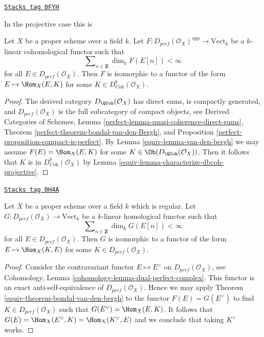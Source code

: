 \begin{theorem}
\label{equiv-theorem-bondal-van-den-bergh}
\href{https://stacks.math.columbia.edu/tag/0FYH}{\texttt{Stacks tag 0FYH}}

\begin{reference}
In the projective case this is \cite[Theorem A.1]{BvdB}
\end{reference}
Let $X$ be a proper scheme over a field $k$.
Let $F : D_{perf}(\mathcal{O}_X)^{opp} \to \text{Vect}_k$
be a $k$-linear cohomological functor such that
$$
\sum\nolimits_{n \in \mathbf{Z}} \dim_k F(E[n]) < \infty
$$
for all $E \in D_{perf}(\mathcal{O}_X)$. Then $F$ is isomorphic to a functor
of the form $E \mapsto \Hom_X(E, K)$ for some
$K \in D^b_{\textit{Coh}}(\mathcal{O}_X)$.
\end{theorem}

\begin{proof}

The derived category $D_\QCoh(\mathcal{O}_X)$ has direct sums,
is compactly generated, and $D_{perf}(\mathcal{O}_X)$ is the full subcategory
of compact objects, see
Derived Categories of Schemes, Lemma
\ref{perfect-lemma-quasi-coherence-direct-sums},
Theorem \ref{perfect-theorem-bondal-van-den-Bergh}, and
Proposition \ref{perfect-proposition-compact-is-perfect}.
By Lemma \ref{equiv-lemma-van-den-bergh} we may assume
$F(E) = \Hom_X(E, K)$ for some $K \in \Ob(D_\QCoh(\mathcal{O}_X))$.
Then it follows that $K$ is in $D^b_{\textit{Coh}}(\mathcal{O}_X)$
by Lemma \ref{equiv-lemma-characterize-dbcoh-projective}.
\end{proof}

\begin{lemma}
\label{equiv-lemma-homological-representable}
\href{https://stacks.math.columbia.edu/tag/0H4A}{\texttt{Stacks tag 0H4A}}

Let $X$ be a proper scheme over a field $k$ which is regular.
Let $G : D_{perf}(\mathcal{O}_X) \to \text{Vect}_k$
be a $k$-linear homological functor such that
$$
\sum\nolimits_{n \in \mathbf{Z}} \dim_k G(E[n]) < \infty
$$
for all $E \in D_{perf}(\mathcal{O}_X)$. Then $G$ is isomorphic to a functor
of the form $E \mapsto \Hom_X(K, E)$ for some $K \in D_{perf}(\mathcal{O}_X)$.
\end{lemma}

\begin{proof}

Consider the contravariant functor $E \mapsto E^\vee$
on $D_{perf}(\mathcal{O}_X)$, see
Cohomology, Lemma \ref{cohomology-lemma-dual-perfect-complex}.
This functor is an exact anti-self-equivalence of $D_{perf}(\mathcal{O}_X)$.
Hence we may apply Theorem \ref{equiv-theorem-bondal-van-den-bergh}
to the functor $F(E) = G(E^\vee)$ to find
$K \in D_{perf}(\mathcal{O}_X)$ such that $G(E^\vee) = \Hom_X(E, K)$.
It follows that $G(E) = \Hom_X(E^\vee, K) = \Hom_X(K^\vee, E)$
and we conclude that taking $K^\vee$ works.
\end{proof}

